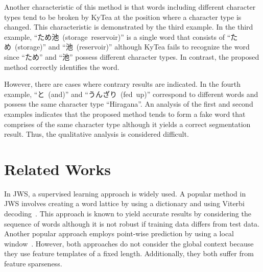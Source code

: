 \documentclass[11pt,letterpaper]{article}
\begin{document}
Another characteristic of this method is that words including different character types tend to be broken by KyTea at the position where a character type is changed. This characteristic is demonstrated by the third example. In the third example, \mbox{``ため池 (storage reservoir)''} is a single word that consists of \mbox{``ため (storage)''} and \mbox{``池 (reservoir)''} although KyTea fails to recognize the word since \mbox{``ため''} and \mbox{``池''} possess different character types. In contrast, the proposed method correctly identifies the word.

However, there are cases where contrary results are indicated. In the fourth example, \mbox{``と (and)''} and \mbox{``うんざり (fed up)''} correspond to different words and possess the same character type \mbox{``Hiragana''}. An analysis of the first and second examples indicates that the proposed method tends to form a fake word that comprises of the same character type although it yields a correct segmentation result. Thus, the qualitative analysis is considered difficult.








\section{Related Works}
\label{sec:relatedworks}

In JWS, a supervised learning approach is widely used. A popular method in JWS involves creating a word lattice by using a dictionary and using Viterbi decoding~\cite{kudo-yamamoto-matsumoto:2004:EMNLP,sassano2002empirical}. This approach is known to yield accurate results by considering the sequence of words although it is not robust if training data differs from test data. Another popular approach employs point-wise prediction by using a local window~\cite{neubig-nakata-mori:2011:ACL-HLT2011,NEUBIG10.408}. However, both approaches do not consider the global context because they use feature templates of a fixed length. Additionally, they both suffer from feature sparseness.
\end{document}
